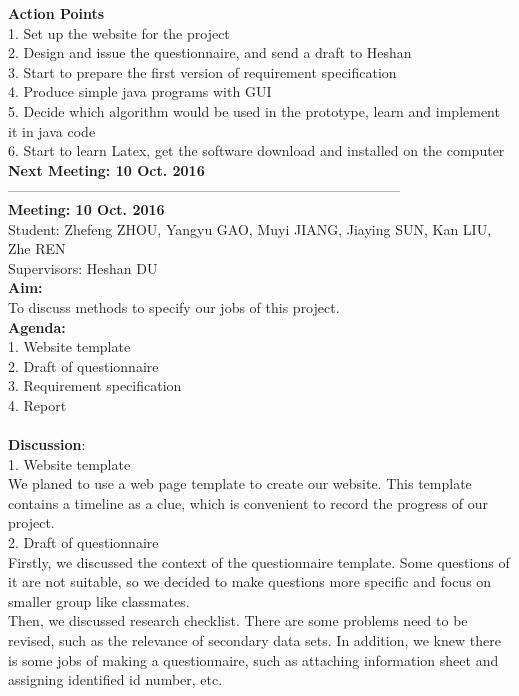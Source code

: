 \documentclass[paper=a4, fontsize=11pt,twoside]{scrartcl}		%
\begin{document}
\textbf{Action Points}\\
1.	Set up the website for the project\\
2.	Design and issue the questionnaire, and send a draft to Heshan\\
3.	Start to prepare the first version of requirement specification\\
4.	Produce simple java programs with GUI\\
5.	Decide which algorithm would be used in the prototype, learn and implement it in java code\\
6.	Start to learn Latex, get the software download and installed on the computer\\

\textbf{Next Meeting: 10 Oct. 2016}\\
------------------------------------------------------------------------------------\\
\textbf{Meeting: 10 Oct. 2016}\\


Student: Zhefeng ZHOU, Yangyu GAO, Muyi JIANG, Jiaying SUN, Kan LIU, Zhe REN\\
Supervisors: Heshan DU\\

\textbf{Aim:} \\
To discuss methods to specify our jobs of this project.\\

\textbf{Agenda:} \\
1.	Website template\\
2.	Draft of questionnaire\\
3.	Requirement specification\\
4.	Report\\\\

\textbf{Discussion}:\\
1.	Website template\\

We planed to use a web page template to create our website. This template 		   contains a timeline as a clue, which is convenient to record the progress of our project.\\
 
2.	Draft of questionnaire\\

Firstly, we discussed the context of the questionnaire template. Some questions of it are not suitable, so we decided to make questions more specific and focus on smaller group like classmates.  \\
	Then, we discussed research checklist. There are some problems need to be revised, such as the relevance of secondary data sets. In addition, we knew there is some jobs of making a questionnaire, such as attaching information sheet and assigning identified id number, etc.\\
\end{document}
